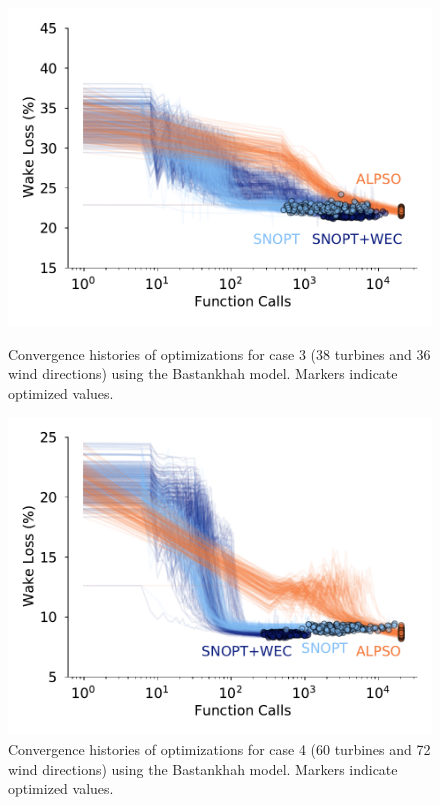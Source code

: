 \documentclass{jpconf}
\begin{document}
\begin{figure}[h!]
	\centering
	\begin{minipage}[t]{.45\textwidth}
		\centering
		\includegraphics[width=\textwidth]{final_images/results/convergence_history_BPAmodel_38turbs_36dirs}  
		\caption{Convergence histories of optimizations for case 3 (38 turbines and 36 wind directions) using the Bastankhah model. Markers indicate optimized values.}
		\label{fig:case-3-histories}
	\end{minipage} \hspace{1pc}
	\begin{minipage}[t]{.45\textwidth}
		\centering
		\includegraphics[width=\textwidth]{final_images/results/convergence_history_BPAmodel_60turbs_72dirs}  
		\caption{Convergence histories of optimizations for case 4 (60 turbines and 72 wind directions) using the Bastankhah model. Markers indicate optimized values.}
		\label{fig:case-4-histories}
	\end{minipage} 
\end{figure}
\end{document}
